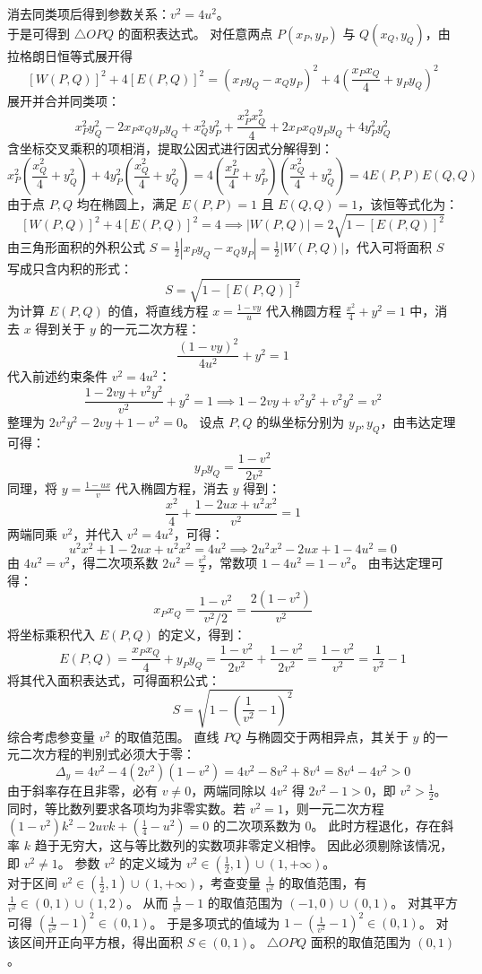 \begin{solution}
消去同类项后得到参数关系：$v^2 = 4u^2$。\\
于是可得到 $\triangle OPQ$ 的面积表达式。
对任意两点 $P(x_P, y_P)$ 与 $Q(x_Q, y_Q)$，由拉格朗日恒等式展开得
$$ [W(P, Q)]^2 + 4[E(P, Q)]^2 = (x_P y_Q - x_Q y_P)^2 + 4\left(\frac{x_P x_Q}{4} + y_P y_Q\right)^2 $$
展开并合并同类项：
$$ x_P^2 y_Q^2 - 2x_P x_Q y_P y_Q + x_Q^2 y_P^2 + \frac{x_P^2 x_Q^2}{4} + 2x_P x_Q y_P y_Q + 4y_P^2 y_Q^2 $$
含坐标交叉乘积的项相消，提取公因式进行因式分解得到：
$$ x_P^2\left(\frac{x_Q^2}{4} + y_Q^2\right) + 4y_P^2\left(\frac{x_Q^2}{4} + y_Q^2\right) = 4\left(\frac{x_P^2}{4} + y_P^2\right)\left(\frac{x_Q^2}{4} + y_Q^2\right) = 4E(P, P)E(Q, Q) $$
由于点 $P, Q$ 均在椭圆上，满足 $E(P, P) = 1$ 且 $E(Q, Q) = 1$，该恒等式化为：
$$ [W(P, Q)]^2 + 4[E(P, Q)]^2 = 4 \implies |W(P, Q)| = 2\sqrt{1 - [E(P, Q)]^2} $$
由三角形面积的外积公式 $S = \frac{1}{2}|x_P y_Q - x_Q y_P| = \frac{1}{2}|W(P, Q)|$，代入可将面积 $S$ 写成只含内积的形式：
$$ S = \sqrt{1 - [E(P, Q)]^2} $$
为计算 $E(P, Q)$ 的值，将直线方程 $x = \frac{1 - vy}{u}$ 代入椭圆方程 $\frac{x^2}{4} + y^2 = 1$ 中，消去 $x$ 得到关于 $y$ 的一元二次方程：
$$ \frac{(1 - vy)^2}{4u^2} + y^2 = 1 $$
代入前述约束条件 $v^2 = 4u^2$：
$$ \frac{1 - 2vy + v^2 y^2}{v^2} + y^2 = 1 \implies 1 - 2vy + v^2 y^2 + v^2 y^2 = v^2 $$
整理为 $2v^2 y^2 - 2vy + 1 - v^2 = 0$。
设点 $P, Q$ 的纵坐标分别为 $y_P, y_Q$，由韦达定理可得：
$$ y_P y_Q = \frac{1 - v^2}{2v^2} $$
同理，将 $y = \frac{1 - ux}{v}$ 代入椭圆方程，消去 $y$ 得到：
$$ \frac{x^2}{4} + \frac{1 - 2ux + u^2 x^2}{v^2} = 1 $$
两端同乘 $v^2$，并代入 $v^2 = 4u^2$，可得：
$$ u^2 x^2 + 1 - 2ux + u^2 x^2 = 4u^2 \implies 2u^2 x^2 - 2ux + 1 - 4u^2 = 0 $$
由 $4u^2 = v^2$，得二次项系数 $2u^2 = \frac{v^2}{2}$，常数项 $1 - 4u^2 = 1 - v^2$。
由韦达定理可得：
$$ x_P x_Q = \frac{1 - v^2}{v^2 / 2} = \frac{2(1 - v^2)}{v^2} $$
将坐标乘积代入 $E(P, Q)$ 的定义，得到：
$$ E(P, Q) = \frac{x_P x_Q}{4} + y_P y_Q = \frac{1 - v^2}{2v^2} + \frac{1 - v^2}{2v^2} = \frac{1 - v^2}{v^2} = \frac{1}{v^2} - 1 $$
将其代入面积表达式，可得面积公式：
$$ S = \sqrt{1 - \left(\frac{1}{v^2} - 1\right)^2} $$
综合考虑参变量 $v^2$ 的取值范围。
直线 $PQ$ 与椭圆交于两相异点，其关于 $y$ 的一元二次方程的判别式必须大于零：
$$ \Delta_y = 4v^2 - 4(2v^2)(1 - v^2) = 4v^2 - 8v^2 + 8v^4 = 8v^4 - 4v^2 > 0 $$
由于斜率存在且非零，必有 $v \neq 0$，两端同除以 $4v^2$ 得 $2v^2 - 1 > 0$，即 $v^2 > \frac{1}{2}$。
同时，等比数列要求各项均为非零实数。若 $v^2 = 1$，则一元二次方程 $(1 - v^2)k^2 - 2uvk + \left(\frac{1}{4} - u^2\right) = 0$ 的二次项系数为 $0$。
此时方程退化，存在斜率 $k$ 趋于无穷大，这与等比数列的实数项非零定义相悖。
因此必须剔除该情况，即 $v^2 \neq 1$。
参数 $v^2$ 的定义域为 $v^2 \in \left(\frac{1}{2}, 1\right) \cup (1, +\infty)$。\\
对于区间 $v^2 \in \left(\frac{1}{2}, 1\right) \cup (1, +\infty)$，考查变量 $\frac{1}{v^2}$ 的取值范围，有 $\frac{1}{v^2} \in (0, 1) \cup (1, 2)$。
从而 $\frac{1}{v^2} - 1$ 的取值范围为 $(-1, 0) \cup (0, 1)$。
对其平方可得 $\left(\frac{1}{v^2} - 1\right)^2 \in (0, 1)$。
于是多项式的值域为 $1 - \left(\frac{1}{v^2} - 1\right)^2 \in (0, 1)$。
对该区间开正向平方根，得出面积 $S \in (0, 1)$。
$\triangle OPQ$ 面积的取值范围为 $(0, 1)$。
\end{solution}


